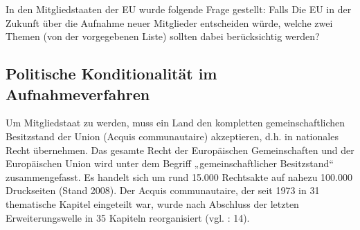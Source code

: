 In den Mitgliedstaaten der EU wurde folgende Frage gestellt: Falls Die EU in der Zukunft über die Aufnahme neuer Mitglieder entscheiden würde, welche zwei Themen (von der vorgegebenen Liste) sollten dabei berücksichtig werden?

\subsection{Politische Konditionalität im Aufnahmeverfahren}
Um Mitgliedstaat zu werden, muss ein Land den kompletten gemeinschaftlichen Besitzstand der Union (Acquis communautaire) akzeptieren, d.h. in nationales Recht übernehmen. Das gesamte Recht der Europäischen Gemeinschaften und der Europäischen Union wird unter dem Begriff „gemeinschaftlicher Besitzstand“ zusammengefasst. Es handelt sich um rund 15.000 Rechtsakte auf nahezu 100.000 Druckseiten (Stand 2008). Der Acquis communautaire, der seit 1973 in 31 thematische Kapitel eingeteilt war, wurde nach Abschluss der letzten Erweiterungswelle in 35 Kapiteln reorganisiert (vgl. \cite{summa} : 14). \par

